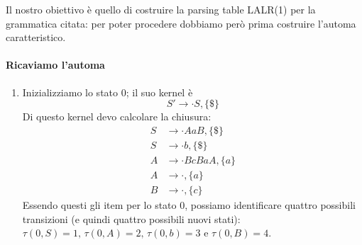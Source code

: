 \documentclass[class=book, crop=false, oneside, 12pt]{standalone}
\begin{document}
Il nostro obiettivo è quello di costruire la parsing table LALR(1) per la grammatica citata: per poter procedere dobbiamo però prima costruire l'automa caratteristico.
\paragraph{Ricaviamo l'automa}
\begin{enumerate}
    \item Inizializziamo lo stato 0; il suo kernel è 
    \begin{equation*}
        S' \to \cdot S, \{\$\}
    \end{equation*}
    Di questo kernel devo calcolare la chiusura:
    \begin{align*}
        S &\to \cdot AaB, \{\$\} \\
        S &\to \cdot b, \{\$\} \\
        A &\to \cdot BcBaA, \{a\} \\
        A &\to \cdot, \{a\} \\
        B &\to \cdot, \{c\}
    \end{align*}
    Essendo questi gli item per lo stato 0, possiamo identificare quattro possibili transizioni (e quindi quattro possibili nuovi stati): \(\tau(0,S)=1 \textrm{, } \tau(0,A)=2 \textrm{, } \tau(0,b)=3 \textrm{ e } \tau(0,B)=4\).
    

\end{enumerate}
\end{document}
